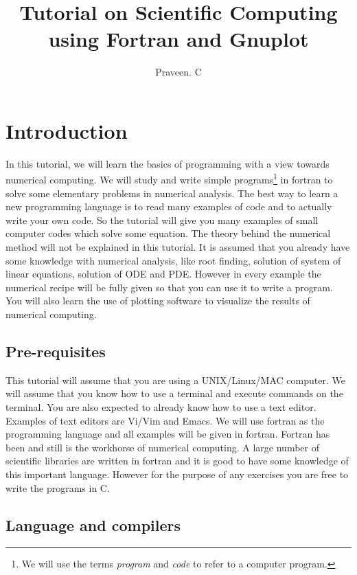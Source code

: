 \documentclass[11pt,oneside]{amsart}
\title{Tutorial on Scientific Computing \\using Fortran and Gnuplot}
\author{Praveen. C}
\date{}                                           %
\begin{document}
\maketitle

\lstset{basicstyle=\ttfamily,language=fortran, frame=single,showstringspaces=false,
numbers=left,numberstyle=\footnotesize}

\section{Introduction}
In this tutorial, we will learn the basics of programming with a view towards numerical computing. We will study and write simple programs\footnote{We will use the terms {\em program} and {\em code} to refer to a computer program.} in fortran to solve some elementary problems in numerical analysis. The best way to learn a new programming language is to read many examples of code and to actually write your own code. So the tutorial will give you many examples of small computer codes which solve some equation. The theory behind the numerical method will not be explained in this tutorial. It is assumed that you already have some knowledge with numerical analysis, like root finding, solution of system of linear equations, solution of ODE and PDE. However in every example the numerical recipe will be fully given so that you can use it to write a program. You will also learn the use of plotting software to visualize the results of  numerical computing.

\subsection{Pre-requisites}

This tutorial will assume that you are using a UNIX/Linux/MAC computer. We will assume that you know how to use a terminal and execute commands on the terminal. You are also expected to already know how to use a text editor. Examples of text editors are Vi/Vim and Emacs. We will use fortran as the programming language and all examples will be given in fortran. Fortran has been and still is the workhorse of numerical computing. A large number of scientific libraries are written in fortran and it is good to have some knowledge of this important language. However for the purpose of any exercises you are free to write the programs in C.

\subsection{Language and compilers}
\end{document}
